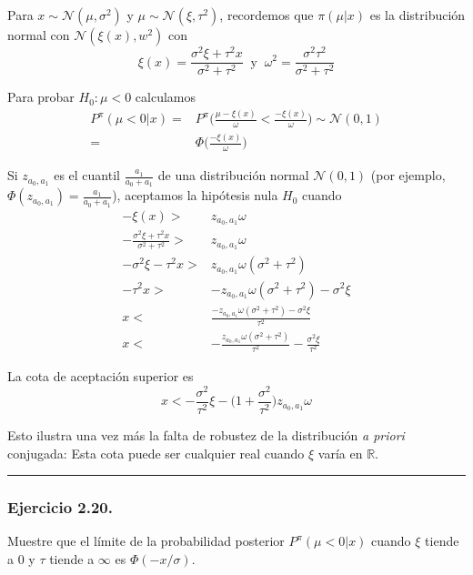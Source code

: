 \documentclass[12pt,]{article}
\begin{document}
Para \(x\sim\mathcal{N}(\mu,\sigma^2)\) y
\(\mu\sim\mathcal{N}(\xi,\tau^2)\), recordemos que \(\pi(\mu|x)\) es la
distribución normal con \(\mathcal{N}(\xi(x),w^2)\) con \[
\xi(x)=\frac{\sigma^2\xi+\tau^2x}{\sigma^2+\tau^2}\ \text{ y }\ \omega^2=\frac{\sigma^2\tau^2}{\sigma^2+\tau^2}
\]

Para probar \(H_0:\mu<0\) calculamos \[
\begin{array}{rl}
P^\pi(\mu<0|x) = &  \displaystyle P^\pi\Bigg(\frac{\mu-\xi(x)}{\omega}<\frac{-\xi(x)}{\omega} \Bigg) \sim \mathcal{N}(0,1) \\
= & \displaystyle   \Phi\bigg(\frac{-\xi(x)}{\omega}\bigg)
\end{array}
\]

Si \(z_{a_0,a_1}\) es el cuantil \(\frac{a_1}{a_0+a_1}\) de una
distribución normal \(\mathcal{N}(0,1)\) (por ejemplo,
\(\Phi(z_{a_0,a_1})=\frac{a_1}{a_0+a_1}\)), aceptamos la hipótesis nula
\(H_0\) cuando \[
\begin{array}{rl}
-\xi(x) > & z_{a_0,a_1} \omega \\
-\displaystyle \frac{\sigma^2\xi+\tau^2 x}{\sigma^2+\tau^2}>& z_{a_0,a_1}\omega \\
-\displaystyle \sigma^2\xi-\tau^2x>& z_{a_0,a_1}\omega(\sigma^2+\tau^2) \\
\displaystyle -\tau^2x>& - z_{a_0,a_1}\omega(\sigma^2+\tau^2) - \sigma^2\xi \\
x<& \displaystyle \frac{-z_{ a_0,a_1}\omega(\sigma^2+\tau^2) - \sigma^2\xi}{\tau^2} \\
x<& \displaystyle -\frac{z_{ a_0,a_1}\omega(\sigma^2+\tau^2)}{\tau^2} - \frac{\sigma^2\xi}{\tau^2}
\end{array}
\]

La cota de aceptación superior es \[
x<-\frac{\sigma^2}{\tau^2}\xi - \bigg(1+ \frac{\sigma^2}{\tau^2} \bigg)z_{a_0,a_1}\omega
\]

Esto ilustra una vez más la falta de robustez de la distribución \emph{a
priori} conjugada: Esta cota puede ser cualquier real cuando \(\xi\)
varía en \(\mathbb{R}\).

\begin{center}\rule{0.5\linewidth}{\linethickness}\end{center}

\subsubsection{Ejercicio 2.20.}\label{ejercicio-2.20.}

Muestre que el límite de la probabilidad posterior \(P^\pi(\mu<0|x)\)
cuando \(\xi\) tiende a \(0\) y \(\tau\) tiende a \(\infty\) es
\(\Phi(-x/\sigma)\).
\end{document}

